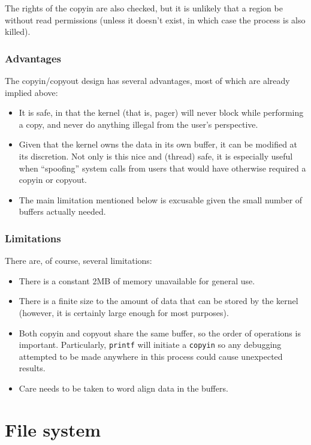 \documentclass[12pt,english]{article}
\begin{document}
The rights of the copyin are also checked, but it is unlikely that a region be without read permissions (unless it doesn't exist, in which case the process is also killed).

\subsubsection{Advantages}

The copyin/copyout design has several advantages, most of which are already implied above:
\begin{itemize}
\item It is safe, in that the kernel (that is, pager) will never block while performing a copy, and never do anything illegal from the user's perspective.
\item Given that the kernel owns the data in its own buffer, it can be modified at its discretion.  Not only is this nice and (thread) safe, it is especially useful when ``spoofing'' system calls from users that would have otherwise required a copyin or copyout.
\item The main limitation mentioned below is excusable given the small number of buffers actually needed.
\end{itemize}

\subsubsection{Limitations}

There are, of course, several limitations:
\begin{itemize}
\item There is a constant 2MB of memory unavailable for general use.
\item There is a finite size to the amount of data that can be stored by the kernel (however, it is certainly large enough for most purposes).
\item Both copyin and copyout share the same buffer, so the order of operations is important.  Particularly, \texttt{printf} will initiate a \texttt{copyin} so any debugging attempted to be made anywhere in this process could cause unexpected results.
\item Care needs to be taken to word align data in the buffers.
\end{itemize}



\newpage{}
\section{File system} \label{vfs}
\end{document}
